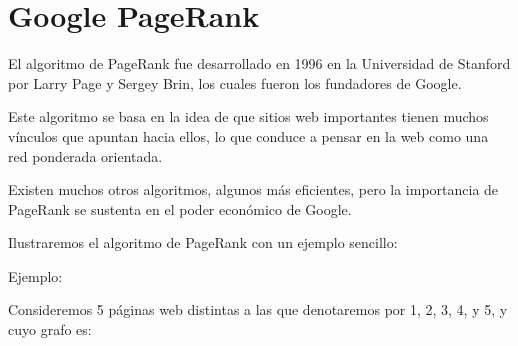 \chapter{Google PageRank}

El algoritmo de PageRank fue desarrollado en 1996 en la Universidad de Stanford por Larry Page y Sergey Brin, los cuales fueron los fundadores de Google.

Este algoritmo se basa en la idea de que sitios web importantes tienen muchos vínculos que apuntan hacia ellos, lo que conduce a pensar en la web como una red ponderada orientada.

Existen muchos otros algoritmos, algunos más eficientes, pero la importancia de PageRank se sustenta en el poder económico de Google.

Ilustraremos el algoritmo de PageRank con un ejemplo sencillo:

Ejemplo:

Consideremos 5 páginas web distintas a las que denotaremos por 1, 2, 3, 4, y 5, y cuyo grafo es:
\vspace{3cm}

